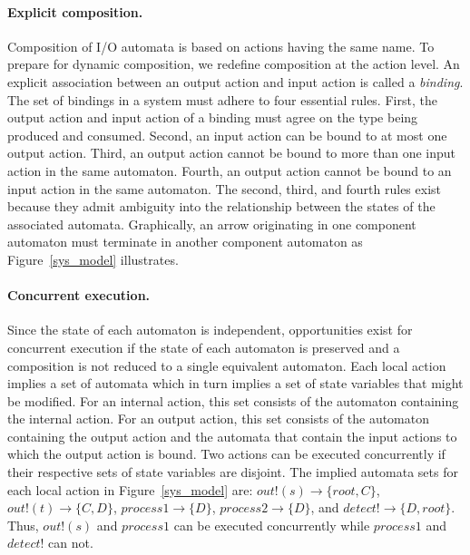 \paragraph*{Explicit composition.}
Composition of I/O automata is based on actions having the same name.
To prepare for dynamic composition, we redefine composition at the action level.
An explicit association between an output action and input action is called a \emph{binding}.
The set of bindings in a system must adhere to four essential rules.
First, the output action and input action of a binding must agree on the type being produced and consumed.
Second, an input action can be bound to at most one output action.
Third, an output action cannot be bound to more than one input action in the same automaton.
Fourth, an output action cannot be bound to an input action in the same automaton.
The second, third, and fourth rules exist because they admit ambiguity into the relationship between the states of the associated automata.
Graphically, an arrow originating in one component automaton must terminate in another component automaton as Figure~\ref{sys_model} illustrates.

\paragraph*{Concurrent execution.}
Since the state of each automaton is independent, opportunities exist for concurrent execution if the state of each automaton is preserved and a composition is not reduced to a single equivalent automaton.
Each local action implies a set of automata which in turn implies a set of state variables that might be modified.
For an internal action, this set consists of the automaton containing the internal action.
For an output action, this set consists of the automaton containing the output action and the automata that contain the input actions to which the output action is bound.
Two actions can be executed concurrently if their respective sets of state variables are disjoint.
The implied automata sets for each local action in Figure~\ref{sys_model} are: $out!(s) \to \{root, C\}$, $out!(t) \to \{C, D\}$, $process1 \to \{D\}$, $process2 \to \{D\}$, and $detect! \to \{D, root\}$.
Thus, $out!(s)$ and $process1$ can be executed concurrently while $process1$ and $detect!$ can not.

